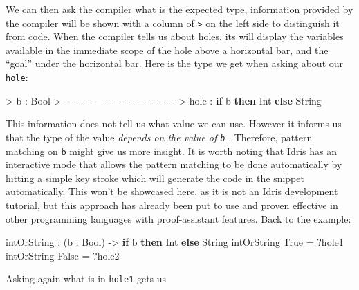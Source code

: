 \documentclass[
]{article}
\newenvironment{Shaded}{}{}
\newcommand{\CommentTok}[1]{\textcolor[rgb]{0.38,0.63,0.69}{\textit{#1}}}
\newcommand{\DataTypeTok}[1]{\textcolor[rgb]{0.56,0.13,0.00}{#1}}
\newcommand{\KeywordTok}[1]{\textcolor[rgb]{0.00,0.44,0.13}{\textbf{#1}}}
\newcommand{\NormalTok}[1]{#1}
\newcommand{\OperatorTok}[1]{\textcolor[rgb]{0.40,0.40,0.40}{#1}}
\newcommand{\OtherTok}[1]{\textcolor[rgb]{0.00,0.44,0.13}{#1}}
\begin{document}
We can then ask the compiler what is the expected type, information
provided by the compiler will be shown with a column of
\texttt{\textgreater{}} on the left side to distinguish it from code.
When the compiler tells us about holes, its will display the variables
available in the immediate scope of the hole above a horizontal bar, and
the ``goal'' under the horizontal bar. Here is the type we get when
asking about our \texttt{hole}:

\begin{Shaded}
\begin{Highlighting}[]
\OperatorTok{\textgreater{}}\NormalTok{ b }\OperatorTok{:} \DataTypeTok{Bool}
\OperatorTok{\textgreater{}} \CommentTok{{-}{-}{-}{-}{-}{-}{-}{-}{-}{-}{-}{-}{-}{-}{-}{-}{-}{-}{-}{-}{-}{-}{-}{-}{-}{-}{-}{-}{-}{-}{-}{-}}
\OperatorTok{\textgreater{}}\NormalTok{ hole }\OperatorTok{:} \KeywordTok{if}\NormalTok{ b }\KeywordTok{then} \DataTypeTok{Int} \KeywordTok{else} \DataTypeTok{String}
\end{Highlighting}
\end{Shaded}

This information does not tell us what value we can use. However it
informs us that the type of the value \emph{depends on the value of
\texttt{b}} . Therefore, pattern matching on \texttt{b} might give us
more insight. It is worth noting that Idris has an interactive mode that
allows the pattern matching to be done automatically by hitting a simple
key stroke which will generate the code in the snippet automatically.
This won't be showcased here, as it is not an Idris development
tutorial, but this approach has already been put to use and proven
effective in other programming languages with proof-assistant
features\cite{tdd}\cite{agda_interactive}. Back to the example:

\begin{Shaded}
\begin{Highlighting}[]
\NormalTok{intOrString }\OperatorTok{:}\NormalTok{ (b }\OperatorTok{:} \DataTypeTok{Bool}\NormalTok{) }\OtherTok{{-}\textgreater{}} \KeywordTok{if}\NormalTok{ b }\KeywordTok{then} \DataTypeTok{Int} \KeywordTok{else} \DataTypeTok{String}
\NormalTok{intOrString }\DataTypeTok{True} \OtherTok{=} \OperatorTok{?}\NormalTok{hole1}
\NormalTok{intOrString }\DataTypeTok{False} \OtherTok{=} \OperatorTok{?}\NormalTok{hole2}
\end{Highlighting}
\end{Shaded}

Asking again what is in \texttt{hole1} gets us
\end{document}
